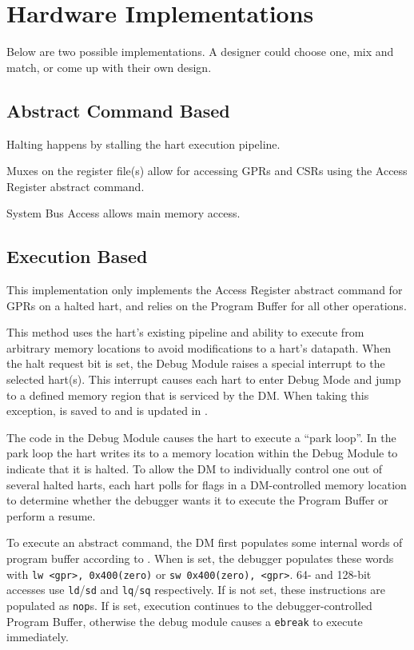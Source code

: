 \chapter{Hardware Implementations}
\label{sec:implementations}

Below are two possible implementations. A designer could choose one, mix and
match, or come up with their own design.

\section{Abstract Command Based}

Halting happens by stalling the hart execution pipeline.

Muxes on the register file(s) allow for accessing GPRs and CSRs
using the Access Register abstract command.

System Bus Access allows main memory access.

\section{Execution Based}

This implementation only implements the Access Register abstract command
for GPRs on a halted hart, and relies on the Program Buffer for all other
operations.

This method uses the hart's existing pipeline
and ability to execute from arbitrary memory locations to avoid
modifications to a hart's datapath.
When the halt request bit is set, the Debug Module raises a special interrupt
to the selected hart(s). This interrupt causes each
hart to enter Debug Mode and jump to a defined
memory region that is serviced by the DM.
When taking this exception, \Rpc is saved to \Rdpc and \Fcause is updated
in \Rdcsr.

The code in the Debug Module causes the hart to execute a ``park loop''.
In the park loop the hart writes its \Rmhartid to a
memory location within the Debug Module to indicate that it is halted.
To allow the DM to individually control one out of several
halted harts, each hart polls for flags in a DM-controlled memory location
to determine whether the debugger wants it to
execute the Program Buffer or perform a resume.

To execute an abstract command, the DM first populates some internal words of
program buffer according to \Rcommand. When \Ftransfer is set, the debugger
populates these words with {\tt lw <gpr>, 0x400(zero)} or {\tt sw 0x400(zero), <gpr>}.
64- and 128-bit accesses use {\tt ld}/{\tt sd} and {\tt lq}/{\tt sq}
respectively. If \Ftransfer is not set, these instructions are populated as {\tt nop}s.
If \Fexecute is set, execution continues to the debugger-controlled Program Buffer,
otherwise the debug module causes a {\tt ebreak} to execute immediately.


